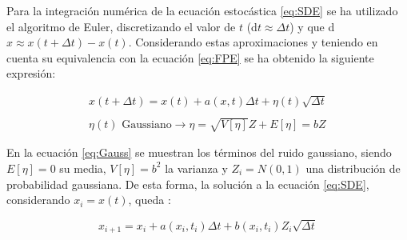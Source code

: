 Para la integraci\'on num\'erica de la ecuaci\'on estoc\'astica \ref{eq:SDE} se ha utilizado el algoritmo de Euler, discretizando el valor de $t$ (d$t \approx \Delta t$) y que d$x \approx x(t+\Delta t) - x(t)$. Considerando estas aproximaciones y teniendo en cuenta su equivalencia con la ecuaci\'on \ref{eq:FPE} se ha obtenido la siguiente expresi\'on:

	\begin{equation}
		\begin{matrix}
		x(t+\Delta t) = x(t) + a(x, t)\Delta t + \eta(t)\sqrt{\Delta t} \\ \\
		\eta(t) \textrm{ Gaussiano} \rightarrow \eta = \sqrt{V[\eta]} Z + E[\eta] = bZ
		\end{matrix}
		\label{eq:Gauss}
	\end{equation}

En la ecuaci\'on \ref{eq:Gauss} se muestran los t\'erminos del ruido gaussiano, siendo $E[\eta] = 0$ su media, $V[\eta] = b^2$ la varianza y $Z_i = N(0, 1)$ una distribuci\'on de probabilidad gaussiana. De esta forma, la soluci\'on a la ecuaci\'on \ref{eq:SDE}, considerando $x_i = x(t)$, queda \cite{gardiner1985handbook}:

	\begin{equation}
		x_{i+1} = x_i + a(x_i, t_i)\Delta t + b(x_i, t_i) Z_i\sqrt{\Delta t}
	\end{equation}
